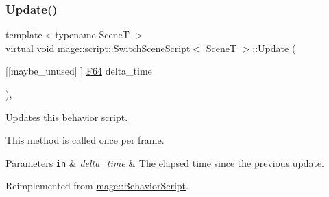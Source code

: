 \subsubsection{\texorpdfstring{Update()}{Update()}}
{\footnotesize\ttfamily template$<$typename SceneT $>$ \\
virtual void \hyperlink{classmage_1_1script_1_1_switch_scene_script}{mage\+::script\+::\+Switch\+Scene\+Script}$<$ SceneT $>$\+::Update (\begin{DoxyParamCaption}\item[{\mbox{[}\mbox{[}maybe\+\_\+unused\mbox{]} \mbox{]} \hyperlink{namespacemage_ad26233bbec640deda836e572c1a23708}{F64}}]{delta\+\_\+time }\end{DoxyParamCaption})\hspace{0.3cm}{\ttfamily [override]}, {\ttfamily [virtual]}}

Updates this behavior script.

This method is called once per frame.


\begin{DoxyParams}[1]{Parameters}
\mbox{\tt in}  & {\em delta\+\_\+time} & The elapsed time since the previous update. \\
\hline
\end{DoxyParams}


Reimplemented from \hyperlink{classmage_1_1_behavior_script_afb9cf3759edf8876416d1df85489cba6}{mage\+::\+Behavior\+Script}.

